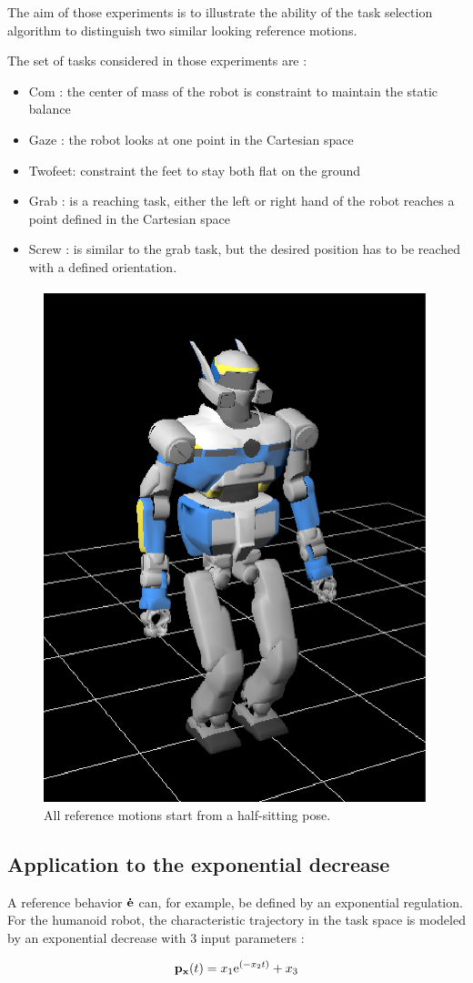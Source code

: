 \documentclass[letterpaper, 10pt, conference]{ieeeconf}      %
\begin{document}
The aim of those experiments is to illustrate the ability of the
task selection algorithm to distinguish two similar looking reference motions.

The set of tasks considered in those experiments are :

\begin{itemize}
\item Com : the center of mass of the robot is constraint to maintain the static balance
\item Gaze : the robot looks at one point in the Cartesian space
\item Twofeet: constraint the feet to stay both flat on the ground
\item Grab : is a reaching task, either the left or right hand
of the robot reaches a point defined in the Cartesian space
\item Screw : is similar to the grab task, but the desired position
has to be reached with a defined orientation.
\end{itemize}
\begin{figure}[t]
\begin{center}
\includegraphics[width=0.3\linewidth]{img/halfSit.ps}
\end{center}
\caption{All reference motions start from a half-sitting pose.}
\label{fig:halfSit}
\end{figure}

\subsection{Application to the exponential decrease}
A reference behavior ${\mathbf{\dot{e}}}$ can, for example, be defined by an exponential regulation.
For the humanoid robot, the characteristic trajectory in the task
space is modeled by an
exponential decrease with 3 input parameters :

\begin{equation}
{\mathbf{p}}_{{\mathbf{x}}}(t) = x_1 \mathrm{e}^{(-x_2 t)} + x_3
\label{eqTask}
\end{equation}
\end{document}
